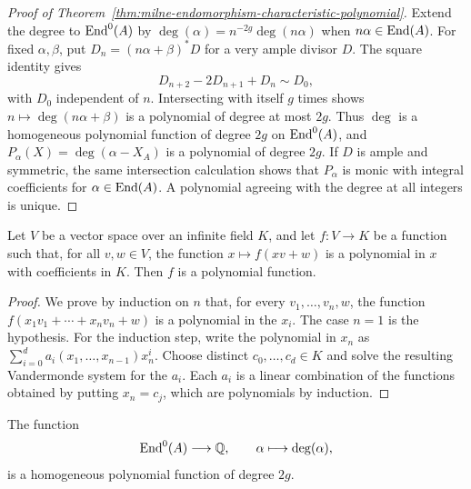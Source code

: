 \begin{proof}[Proof of Theorem~\ref{thm:milne-endomorphism-characteristic-polynomial}]
Extend the degree to $\operatorname{End}^0(A)$ by
$\deg(\alpha)=n^{-2g}\deg(n\alpha)$ when $n\alpha\in\operatorname{End}(A)$.  For fixed
$\alpha,\beta$, put $D_n=(n\alpha+\beta)^*D$ for a very ample divisor $D$.
The square identity gives
\[
D_{n+2}-2D_{n+1}+D_n\sim D_0,
\]
with $D_0$ independent of $n$.  Intersecting with itself $g$ times shows
$n\mapsto\deg(n\alpha+\beta)$ is a polynomial of degree at most $2g$.
Thus $\deg$ is a homogeneous polynomial function of degree $2g$ on
$\operatorname{End}^0(A)$, and $P_\alpha(X)=\deg(\alpha-X_A)$ is a polynomial of degree
$2g$.  If $D$ is ample and symmetric, the same intersection calculation
shows that $P_\alpha$ is monic with integral coefficients for
$\alpha\in\operatorname{End}(A)$.  A polynomial agreeing with the degree at all integers is
unique.
\end{proof}

\begin{lemma}
\label{lem:milne-polynomial-function}

Let $V$ be a vector space over an infinite field $K$, and let $f:V\to K$ be
a function such that, for all $v,w\in V$, the function
$x\mapsto f(xv+w)$ is a polynomial in $x$ with coefficients in $K$.  Then
$f$ is a polynomial function.
\end{lemma}

\begin{proof}
We prove by induction on $n$ that, for every $v_1,\ldots,v_n,w$, the
function $f(x_1v_1+\cdots+x_nv_n+w)$ is a polynomial in the $x_i$.  The case
$n=1$ is the hypothesis.  For the induction step, write the polynomial in
$x_n$ as $\sum_{i=0}^d a_i(x_1,\ldots,x_{n-1})x_n^i$.  Choose distinct
$c_0,\ldots,c_d\in K$ and solve the resulting Vandermonde system for the
$a_i$.  Each $a_i$ is a linear combination of the functions obtained by
putting $x_n=c_j$, which are polynomials by induction.
\end{proof}

\begin{proposition}
\label{prop:milne-degree-polynomial-function}

The function
\[
\operatorname{End}^0(A)\longrightarrow\mathbb{Q},\qquad \alpha\longmapsto\deg(\alpha),
\]
is a homogeneous polynomial function of degree $2g$.
\end{proposition}

